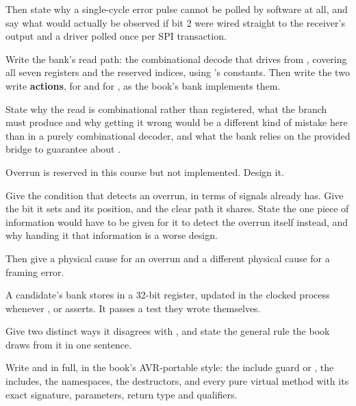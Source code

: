 Then state why a single-cycle error pulse cannot be polled by software at all, and say what would
actually be observed if  bit 2 were wired straight to the receiver's 
output and a driver polled  once per SPI transaction. 

 Write the bank's read path: the combinational decode that drives  from
, covering all seven registers and the reserved indices, using 's
constants. Then write the two write \textbf{actions}, for  and for , as
the book's bank implements them.

State why the read is combinational rather than registered, what the  branch must
produce and why getting it wrong would be a different kind of mistake here than in a purely
combinational decoder, and what the bank relies on the provided bridge to guarantee about
. 

 Overrun is reserved in this course but not implemented. Design it.

Give the condition that detects an overrun, in terms of signals  already has. Give
the  bit it sets and its position, and the clear path it shares. State the one
piece of information  would have to be given for it to detect the overrun itself
instead, and why handing it that information is a worse design.

Then give a physical cause for an overrun and a different physical cause for a framing error.

 A candidate's bank stores  in a 32-bit register, updated in the clocked
process whenever ,  or  asserts. It passes a test they
wrote themselves.

Give two distinct ways it disagrees with , and state the general rule the book
draws from it in one sentence. 

\label{exb:q:5}

 Write  and
 in full, in the book's AVR-portable style: the include
guard or , the includes, the namespaces, the destructors, and every pure virtual method
with its exact signature, parameters, return type and qualifiers.

